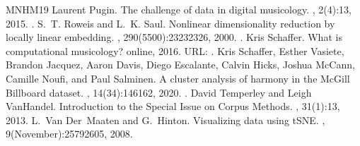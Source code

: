 \documentclass[letterpaper,10pt,english]{sphinxmanual}
\begin{document}
\begin{sphinxthebibliography}{MNHM19}
Laurent Pugin. The challenge of data in digital musicology. , 2(4):1\textendash{}3, 2015. .
S. T. Roweis and L. K. Saul. Nonlinear dimensionality reduction by locally linear embedding. , 290(5500):2323\textendash{}2326, 2000. .
Kris Schaffer. What is computational musicology? online, 2016. URL: .
Kris Schaffer, Esther Vasiete, Brandon Jacquez, Aaron Davis, Diego Escalante, Calvin Hicks, Joshua McCann, Camille Noufi, and Paul Salminen. A cluster analysis of harmony in the McGill Billboard dataset. , 14(3\textendash{}4):146\textendash{}162, 2020. .
David Temperley and Leigh VanHandel. Introduction to the Special Issue on Corpus Methods. , 31(1):1\textendash{}3, 2013.
L. Van Der Maaten and G. Hinton. Visualizing data using t\sphinxhyphen{}SNE. , 9(November):2579\textendash{}2605, 2008.
\end{sphinxthebibliography}



\renewcommand{\indexname}{Index}
\printindex
\end{document}
